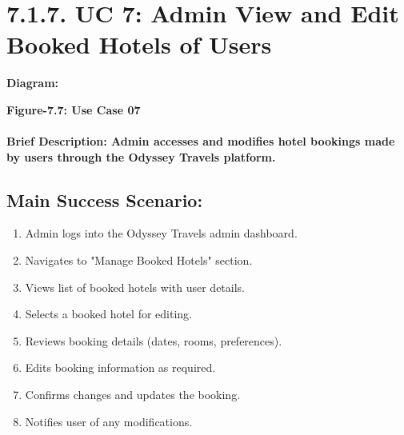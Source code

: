 \documentclass{scrreprt}
\begin{document}
\section*{\textbf{7.1.7. UC 7: Admin View and Edit Booked Hotels of Users}}
\textbf{Diagram:}
\newline
\newline

\begin{center}
    \parbox{0.8\textwidth}{ 
        \centering
    }
\end{center}
\begin{center}
    \parbox{0.8\textwidth}{ 
        \centering
        \textbf{Figure-7.7: Use Case 07}
    }
\end{center}

\paragraph {\textnormal{Brief Description: 
Admin accesses and modifies hotel bookings made by users through the Odyssey Travels platform.}}

\subsection*{\textbf{Main Success Scenario:}}

\begin{enumerate}
    \item Admin logs into the Odyssey Travels admin dashboard.
    \item Navigates to "Manage Booked Hotels" section.
    \item Views list of booked hotels with user details.
    \item Selects a booked hotel for editing.
    \item Reviews booking details (dates, rooms, preferences).
    \item Edits booking information as required.
    \item Confirms changes and updates the booking.
    \item Notifies user of any modifications.
\end{enumerate}
\end{document}
